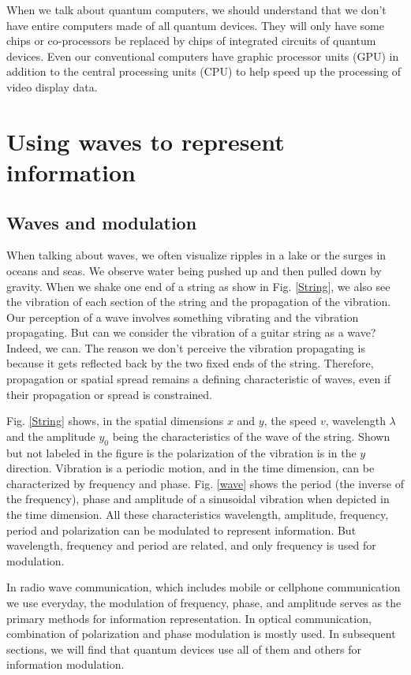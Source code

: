 \documentclass{book}
\begin{document}
When we talk about quantum computers, we should understand that we don't have entire computers made of all quantum devices. They will only have some chips or co-processors be replaced by chips of integrated circuits of quantum devices. Even our conventional computers have graphic processor units (GPU) in addition to the central processing units (CPU) to help speed up the processing of video display data.

\chapter{Using waves to represent information}
\section{Waves and modulation}
When talking about waves, we often visualize ripples in a lake or the surges in oceans and seas. We observe water being pushed up and then pulled down by gravity. When we shake one end of a string as show in Fig. \ref{String}, we also see the vibration of each section of the string and the propagation of the vibration. Our perception of a wave involves something vibrating and the vibration propagating. But can we consider the vibration of a guitar string as a wave? Indeed, we can. The reason we don't perceive the vibration propagating is because it gets reflected back by the two fixed ends of the string. Therefore, propagation or spatial spread remains a defining characteristic of waves, even if their propagation or spread is constrained.

Fig. \ref{String} shows, in the spatial dimensions $x$ and $y$, the speed $v$, wavelength $\lambda$ and the amplitude $y_0$ being the characteristics of the wave of the string. Shown but not labeled in the figure is the polarization of the vibration is in the $y$ direction. Vibration is a periodic motion, and in the time dimension, can be characterized by frequency and phase. Fig. \ref{wave} shows the period (the inverse of the frequency), phase and amplitude of a sinusoidal vibration when depicted in the time dimension. All these characteristics wavelength, amplitude, frequency, period and polarization can be modulated to represent information. But wavelength, frequency and period are related, and only frequency is used for modulation.

In radio wave communication, which includes mobile or cellphone communication we use everyday, the modulation of frequency, phase, and amplitude serves as the primary methods for information representation. In optical communication, combination of polarization and phase modulation is mostly used. In subsequent sections, we will find that quantum devices use all of them and others for information modulation.
\end{document}
